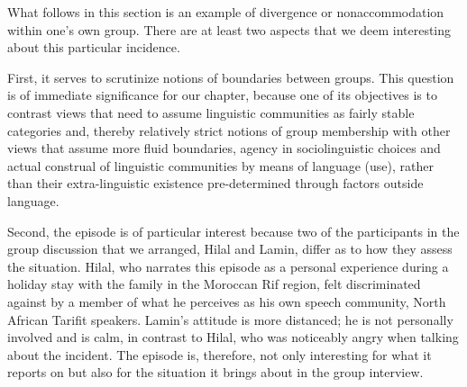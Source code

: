 \documentclass[output=paper,colorlinks,citecolor=brown]{langscibook}
\begin{document}
What follows in this section is an example of divergence or nonaccommodation within one's own group. There are at least two aspects that we deem interesting about this particular incidence. 

First, it serves to scrutinize notions of boundaries between groups. This question is of immediate significance for our chapter, because one of its objectives is to contrast views that need to assume linguistic communities as fairly stable categories and, thereby relatively strict notions of group membership with other views that assume more fluid boundaries, agency in sociolinguistic choices and actual construal of linguistic communities by means of language (use), rather than their extra-linguistic existence pre-determined through factors outside language.

Second, the episode is of particular interest because two of the participants in the group discussion that we arranged, Hilal and Lamin, differ as to how they assess the situation. Hilal, who narrates this episode as a personal experience during a holiday stay with the family in the Moroccan Rif region, felt discriminated against by a member of what he perceives as his own speech community, North African Tarifit speakers. Lamin's attitude is more distanced; he is not personally involved and is calm, in contrast to Hilal, who was noticeably angry when talking about the incident. The episode is, therefore, not only interesting for what it reports on but also for the situation it brings about in the group interview. 
\end{document}
